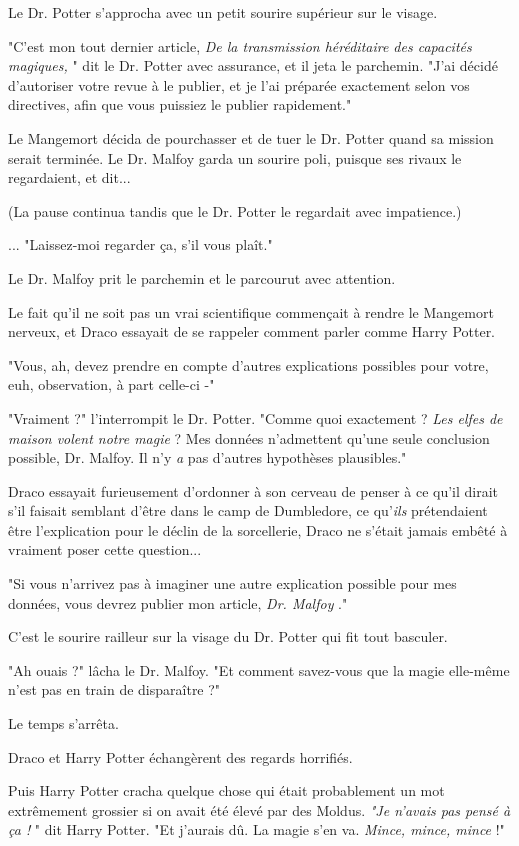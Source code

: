 Le Dr. Potter s'approcha avec un petit sourire supérieur sur le visage.

"C'est mon tout dernier article, \emph{De la transmission héréditaire des capacités magiques,} " dit le Dr. Potter avec assurance, et il jeta le parchemin. "J'ai décidé d'autoriser votre revue à le publier, et je l'ai préparée exactement selon vos directives, afin que vous puissiez le publier rapidement."

Le Mangemort décida de pourchasser et de tuer le Dr. Potter quand sa mission serait terminée. Le Dr. Malfoy garda un sourire poli, puisque ses rivaux le regardaient, et dit...

(La pause continua tandis que le Dr. Potter le regardait avec impatience.)

... "Laissez-moi regarder ça, s'il vous plaît."

Le Dr. Malfoy prit le parchemin et le parcourut avec attention.

Le fait qu'il ne soit pas un vrai scientifique commençait à rendre le Mangemort nerveux, et Draco essayait de se rappeler comment parler comme Harry Potter.

"Vous, ah, devez prendre en compte d'autres explications possibles pour votre, euh, observation, à part celle-ci -"

"Vraiment ?" l'interrompit le Dr. Potter. "Comme quoi exactement ? \emph{Les elfes de maison volent notre magie}  ? Mes données n'admettent qu'une seule conclusion possible, Dr. Malfoy. Il n'y \emph{a}  pas d'autres hypothèses plausibles."

Draco essayait furieusement d'ordonner à son cerveau de penser à ce qu'il dirait s'il faisait semblant d'être dans le camp de Dumbledore, ce qu'\emph{ils}  prétendaient être l'explication pour le déclin de la sorcellerie, Draco ne s'était jamais embêté à vraiment poser cette question...

"Si vous n'arrivez pas à imaginer une autre explication possible pour mes données, vous devrez publier mon article, \emph{Dr. Malfoy} ."

C'est le sourire railleur sur la visage du Dr. Potter qui fit tout basculer.

"Ah ouais ?" lâcha le Dr. Malfoy. "Et comment savez-vous que la magie elle-même n'est pas en train de disparaître ?"

Le temps s'arrêta.

Draco et Harry Potter échangèrent des regards horrifiés.

Puis Harry Potter cracha quelque chose qui était probablement un mot extrêmement grossier si on avait été élevé par des Moldus. \emph{"Je n'avais pas pensé à ça !} " dit Harry Potter. "Et j'aurais dû. La magie s'en va. \emph{Mince, mince, mince}  !"

